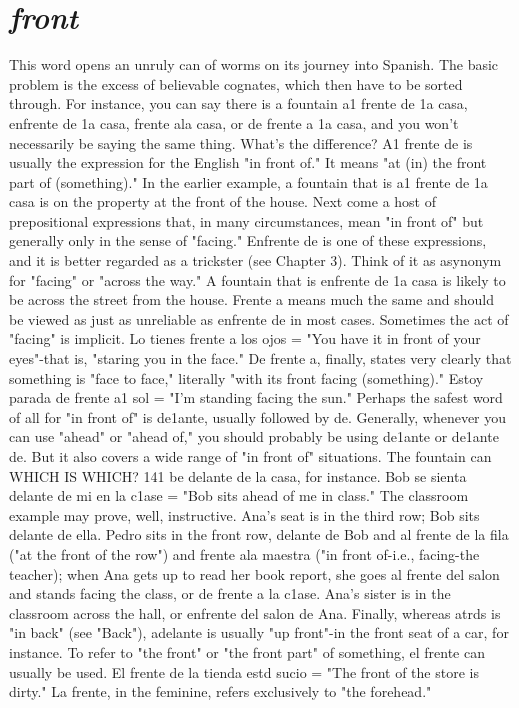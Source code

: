 \section{\emph{front}}

This word opens an unruly can of worms on its journey into
Spanish. The basic problem is the excess of believable cognates, which
then have to be sorted through. For instance, you can say there is a
fountain a1 frente de 1a casa, enfrente de 1a casa, frente ala casa, or
de frente a 1a casa, and you won't necessarily be saying the same
thing. What's the difference?
A1 frente de is usually the expression for the English "in front
of." It means "at (in) the front part of (something)." In the earlier example, a fountain that is a1 frente de 1a casa is on the property at the
front of the house. Next come a host of prepositional expressions that,
in many circumstances, mean "in front of" but generally only in the
sense of "facing." Enfrente de is one of these expressions, and it is better regarded as a trickster (see Chapter 3). Think of it as asynonym for
"facing" or "across the way." A fountain that is enfrente de 1a casa is
likely to be across the street from the house. Frente a means much the
same and should be viewed as just as unreliable as enfrente de in most
cases. Sometimes the act of "facing" is implicit. Lo tienes frente a los
ojos = "You have it in front of your eyes"-that is, "staring you in the
face." De frente a, finally, states very clearly that something is "face
to face," literally "with its front facing (something)." Estoy parada de
frente a1 sol = "I'm standing facing the sun."
Perhaps the safest word of all for "in front of" is de1ante, usually followed by de. Generally, whenever you can use "ahead" or
"ahead of," you should probably be using de1ante or de1ante de. But it
also covers a wide range of "in front of" situations. The fountain can
WHICH IS WHICH? 141
be delante de la casa, for instance. Bob se sienta delante de mi en la
c1ase = "Bob sits ahead of me in class."
The classroom example may prove, well, instructive. Ana's
seat is in the third row; Bob sits delante de ella. Pedro sits in the front
row, delante de Bob and al frente de la fila ("at the front of the row")
and frente ala maestra ("in front of-i.e., facing-the teacher); when
Ana gets up to read her book report, she goes al frente del salon and
stands facing the class, or de frente a la c1ase. Ana's sister is in the
classroom across the hall, or enfrente del salon de Ana.
Finally, whereas atrds is "in back" (see "Back"), adelante is
usually "up front"-in the front seat of a car, for instance. To refer to
"the front" or "the front part" of something, el frente can usually be
used. El frente de la tienda estd sucio = "The front of the store is
dirty." La frente, in the feminine, refers exclusively to "the forehead."

